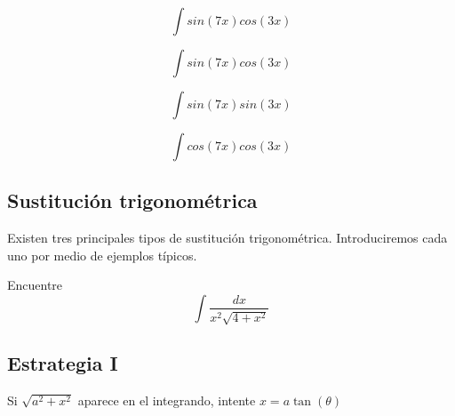  \begin{problema}
  \label{ayr:32.7}
  $$
  \int sin(7x)cos(3x)
  $$
 \end{problema}




 \begin{problema}
  \label{ayr:exmp:32.8}
  $$
  \int sin(7x)cos(3x)
  $$
 \end{problema}




 \begin{problema}
  \label{ayr:32.9}
  $$
  \int sin(7x)sin(3x)
  $$
 \end{problema}




 \begin{problema}
  \label{ayr:32.10}
  $$
  \int cos(7x)cos(3x)
  $$
 \end{problema}



\subsection{Sustituci\'on trigonométrica}


Existen tres principales tipos de sustituci\'on trigonométrica. Introduciremos cada uno por medio de ejemplos típicos.



\begin{problema}
 \label{ayr:exmp:32.11}
 Encuentre
 $$
 \displaystyle \int \dfrac{dx}{x^{2}\sqrt{4+x^{2}}}
 $$
\end{problema}



% 
%  
% 

 \subsection{Estrategia I}
  
 Si $\sqrt{a^{2}+x^{2}}$ aparece en el integrando, intente $x=a\tan(\theta)$




